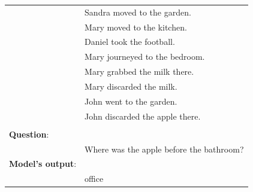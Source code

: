 \begin{figure}[!h]
\begin{minipage}{\textwidth}
\begin{tabular}{l l}
& Sandra moved to the garden. \\
& Mary moved to the kitchen. \\
& Daniel took the football. \\
& Mary journeyed to the bedroom. \\
& Mary grabbed the milk there. \\
& Mary discarded the milk. \\
& John went to the garden. \\
& John discarded the apple there. \\
\\
\textbf{Question}: & \\
& Where was the apple before the bathroom? \\
\textbf{Model's output}: & \\
& office
\end{tabular}
\end{minipage}
\end{figure}
